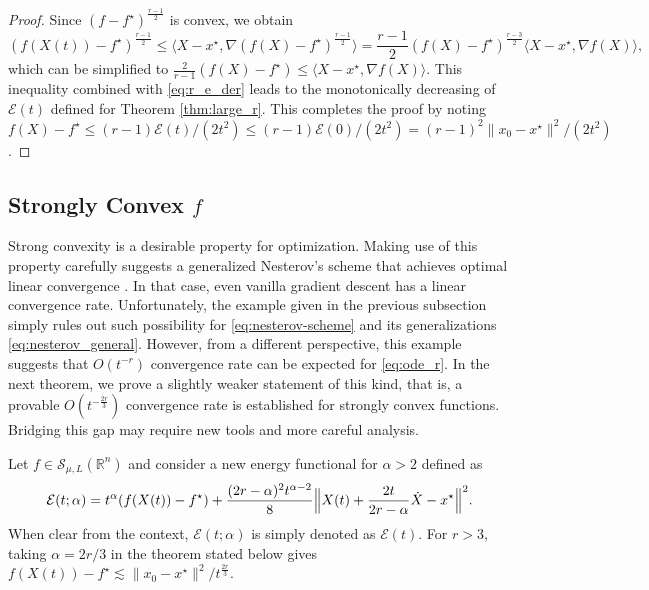 \documentclass[twoside,11pt]{article}
\newcommand{\R}{\mathbb{R}}
\begin{document}
\begin{proof}
Since $(f - f^\star)^{\frac{r-1}{2}}$ is convex, we obtain
\[
\left( f(X(t)) - f^\star \right)^{\frac{r-1}{2}} \le \langle X - x^\star, \nabla(f(X) - f^\star)^{\frac{r-1}{2}} \rangle = \frac{r-1}{2}(f(X) - f^\star)^{\frac{r-3}{2}}\langle X - x^\star, \nabla f(X)\rangle,
\]
which can be simplified to $\frac{2}{r-1}(f(X) - f^\star) \le \langle X - x^\star, \nabla f(X)\rangle$. This inequality combined with \eqref{eq:r_e_der} leads to the monotonically decreasing of $\mathcal{E}(t)$ defined for Theorem \ref{thm:large_r}. This completes the proof by noting $f(X)-f^\star\le (r-1)\mathcal{E}(t)/(2t^2)\le (r-1)\mathcal{E}(0)/(2t^2) = (r-1)^2\|x_0 - x^\star\|^2/(2t^2)$.
\end{proof}




\subsection{Strongly Convex $f$}
\label{sec:bett-conv-rate}
Strong convexity is a desirable property for optimization. Making use of this property carefully suggests a generalized Nesterov's scheme that achieves optimal linear convergence \citep{nesterov-book}. In that case, even vanilla gradient descent has a linear convergence rate. Unfortunately, the example given in the previous
subsection simply rules out such possibility for \eqref{eq:nesterov-scheme} and
its generalizations \eqref{eq:nesterov_general}. However, from a
different perspective, this example suggests that $O(t^{-r})$
convergence rate can be expected for \eqref{eq:ode_r}. In the next
theorem, we prove a slightly weaker statement of this kind, that is, a
provable $O(t^{-\frac{2r}{3}})$ convergence rate is established for
strongly convex functions. Bridging this gap may require new tools and
more careful analysis.

Let $f\in\mathcal{S}_{\mu,L}(\R^n)$ and consider a new energy functional for $\alpha > 2$ defined as
\begin{equation}\nonumber
\mathcal{E}(t; \alpha) = t^{\alpha}(f(X(t)) - f^\star) + \frac{(2r-\alpha)^2t^{\alpha-2}}{8}\Big{\|}X(t) + \frac{2t}{2r-\alpha}\dot X - x^\star\Big{\|}^2.
\end{equation}
When clear from the context, $\mathcal{E}(t; \alpha)$ is simply denoted as $\mathcal{E}(t)$. For $r > 3$, taking $\alpha = 2r/3$ in the theorem stated below gives $f(X(t)) - f^\star \lesssim \|x_0 -x^\star\|^2/t^{\frac{2r}{3}}$. 
\end{document}
